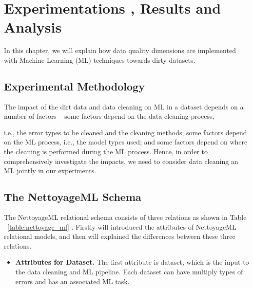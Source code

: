 \chapter{Experimentations , Results and Analysis}

\ifpdf
    \graphicspath{{Chapter4/Figs/Raster/}{Chapter4/Figs/PDF/}{Chapter4/Figs/}}
\else
    \graphicspath{{Chapter4/Figs/Vector/}{Chapter4/Figs/}}
\fi

In this chapter, we will explain how data quality dimensions are implemented with Machine Learning (ML) techniques towards dirty datasets. 

\section{Experimental Methodology}  

The impact of the dirt data and data cleaning on ML in a dataset depends on a number of factors -- some factors depend on the data cleaning process, 

i.e., the error types to be cleaned and the cleaning methods; some factors depend on the ML
process, i.e., the model types used; and some factors depend on where the cleaning is performed during the ML process. Hence, in order to comprehensively investigate the impacts, we need to consider data cleaning an ML jointly in our experiments.


\section{The NettoyageML Schema}  

The NettoyageML relational schema consists of three relations as shown in Table ~\ref{table:nettoyage_ml} . Firstly will introduced the attributes of NettoyageML relational models, and then will explained 
the differences between these three relations.


\begin{itemize}
	\item {
		\textbf{Attributes for Dataset.} The first attribute is dataset, which is the input to the data cleaning and ML pipeline. Each dataset can have multiply types of errors and has an associated ML task. 
	}
\end{itemize}

